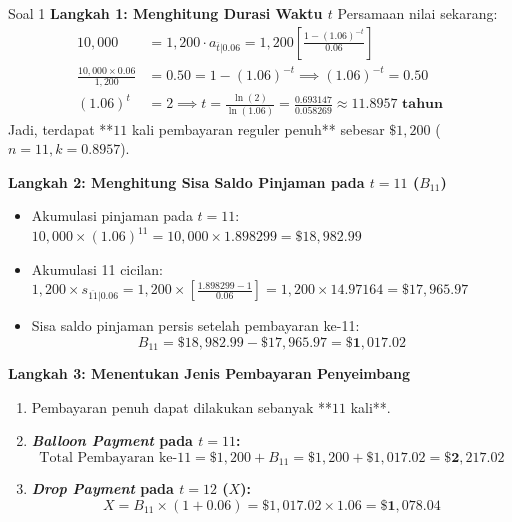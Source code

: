 \documentclass[11pt,a4paper]{article}
\begin{document}
\begin{solutionbox}{Soal 1}
\textbf{Langkah 1: Menghitung Durasi Waktu $t$}
Persamaan nilai sekarang:
\begin{align*}
    10{,}000 &= 1{,}200 \cdot a_{\overline{t}|0.06} = 1{,}200 \left[ \frac{1 - (1.06)^{-t}}{0.06} \right] \\[0.4em]
    \frac{10{,}000 \times 0.06}{1{,}200} &= 0.50 = 1 - (1.06)^{-t} \implies (1.06)^{-t} = 0.50 \\[0.4em]
    (1.06)^t &= 2 \implies t = \frac{\ln(2)}{\ln(1.06)} = \frac{0.693147}{0.058269} \approx \mathbf{11.8957 \text{ tahun}}
\end{align*}
Jadi, terdapat **$11$ kali pembayaran reguler penuh** sebesar $\$1{,}200$ ($n = 11, k = 0.8957$).

\textbf{Langkah 2: Menghitung Sisa Saldo Pinjaman pada $t = 11$ ($B_{11}$)}
\begin{itemize}
    \item Akumulasi pinjaman pada $t = 11$: $10{,}000 \times (1.06)^{11} = 10{,}000 \times 1.898299 = \$18{,}982.99$
    \item Akumulasi 11 cicilan: $1{,}200 \times s_{\overline{11}|0.06} = 1{,}200 \times \left[\frac{1.898299 - 1}{0.06}\right] = 1{,}200 \times 14.97164 = \$17{,}965.97$
    \item Sisa saldo pinjaman persis setelah pembayaran ke-11:
    \begin{equation*}
        B_{11} = \$18{,}982.99 - \$17{,}965.97 = \mathbf{\$1{,}017.02}
    \end{equation*}
\end{itemize}

\textbf{Langkah 3: Menentukan Jenis Pembayaran Penyeimbang}
\begin{enumerate}[label=(\alph*)]
    \item Pembayaran penuh dapat dilakukan sebanyak **$11$ kali**.
    \item \textbf{\textit{Balloon Payment} pada $t = 11$:}
    \begin{equation*}
        \text{Total Pembayaran ke-11} = \$1{,}200 + B_{11} = \$1{,}200 + \$1{,}017.02 = \mathbf{\$2{,}217.02}
    \end{equation*}
    \item \textbf{\textit{Drop Payment} pada $t = 12$ ($X$):}
    \begin{equation*}
        X = B_{11} \times (1 + 0.06) = \$1{,}017.02 \times 1.06 = \mathbf{\$1{,}078.04}
    \end{equation*}
\end{enumerate}
\end{solutionbox}
\end{document}

